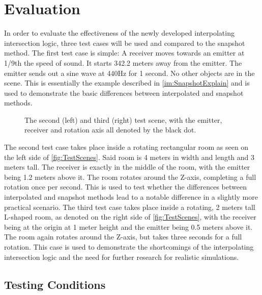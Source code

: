 \chapter{Evaluation}\label{ch:Evaluation}

In order to evaluate the effectiveness of the newly developed interpolating intersection logic,
three test cases will be used and compared to the snapshot method.
\newline
The first test case is simple: A receiver moves towards an emitter at 1/9th the speed of sound.
It starts 342.2 meters away from the emitter.
The emitter sends out a sine wave at 440Hz for 1 second.
No other objects are in the scene.
\newline
This is essentially the example described in \ref{im:SnapshotExplain}
and is used to demonstrate the basic differences between interpolated and snapshot methods.
\newline
\begin{figure}[t!]
    
    \caption{The second (left) and third (right) test scene, with the emitter, receiver and rotation axis all denoted by the black dot.}\label{fig:TestScenes}
\end{figure}
The second test case takes place inside a rotating rectangular room as seen on the left side of \autoref{fig:TestScenes}.
Said room is 4 meters in width and length and 3 meters tall.
The receiver is exactly in the middle of the room,
with the emitter being 1.2 meters above it.
The room rotates around the Z-axis, completing a full rotation once per second.
\newline
This is used to test whether the differences between interpolated and snapshot methods
lead to a notable difference in a slightly more practical scenario.
\newline
The third test case takes place inside a rotating, 2 meters tall L-shaped room,
as denoted on the right side of \autoref{fig:TestScenes},
with the receiver being at the origin at 1 meter height and the emitter being 0.5 meters above it.
The room again rotates around the Z-axis, but takes three seconds for a full rotation.
\newline
This case is used to demonstrate the shortcomings of the interpolating intersection logic
and the need for further research for realistic simulations.

\section{Testing Conditions}

